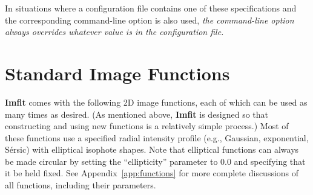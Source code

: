 \documentclass[10pt,a4paper,article]{memoir}
\newcommand{\imfit}{\textbf{Imfit}}
\newcommand{\Imfit}{\textbf{Imfit}}
\begin{document}
In situations where a configuration file contains one of these specifications
and the corresponding command-line option is also used, \textit{the command-line option
always overrides whatever value is  in the configuration file.}



\newpage

\chapter{Standard Image Functions}

\Imfit{} comes with the following 2D image functions, each of
which can be used as many times as desired. (As mentioned above, \imfit{}
is designed so that constructing and using new functions is a relatively
simple process.) Most of these functions use a specified radial intensity
profile (e.g., Gaussian, exponential, S{\'e}rsic) with elliptical isophote
shapes. Note that elliptical functions can always be made circular
by setting the ``ellipticity'' parameter to 0.0 and specifying that it be
held fixed. See Appendix~\ref{app:functions} for more complete discussions of all
functions, including their parameters.
\end{document}
